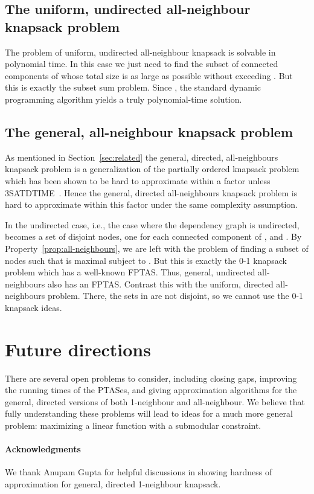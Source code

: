 \documentclass[12pt]{article}
\begin{document}
\subsection{The uniform, undirected all-neighbour knapsack problem}

The problem of uniform, undirected all-neighbour knapsack is
solvable in polynomial time.
In this case we just need to find the subset of connected components of 
whose total size is as large as possible without exceeding .
But this is exactly the subset sum problem.  Since , the standard
dynamic programming algorithm yields a truly polynomial-time 
solution.

\subsection{The general, all-neighbour knapsack problem}

As mentioned in Section~\ref{sec:related} the general, directed, all-neighbours
knapsack problem is a generalization of the partially ordered knapsack
problem~\cite{Kolliopoulos:2007p1242} which has been shown to be hard to
approximate within a  factor unless
3SATDTIME~\cite{Hajiaghayi:2006p1244}.
Hence the general, directed all-neighbours knapsack problem is hard
to approximate within this factor under the same complexity assumption.

In the undirected case, i.e., the case where the dependency graph 
is undirected,  becomes a set of disjoint nodes,
one for each connected component of ,
and .  By Property~\ref{prop:all-neighbours},
we are left with the problem of finding a subset of nodes  such that  is maximal subject to .
But this is exactly the 0-1 knapsack problem which has a well-known
FPTAS.  Thus, general, undirected all-neighbours also has an FPTAS.
Contrast this with the uniform, directed all-neighbours problem.
There, the sets in  are not disjoint, so we cannot use
the 0-1 knapsack ideas.


\section{Future directions}

There are several open problems to consider, including closing gaps,
improving the running times of the PTASes, and giving approximation
algorithms for the general, directed versions of both 1-neighbour and
all-neighbour. We believe that fully understanding these problems will
lead to ideas for a much more general problem: maximizing a linear
function with a submodular constraint.






\paragraph{{\bf Acknowledgments}}
We thank Anupam Gupta for helpful
discussions in showing hardness of approximation for general,
directed 1-neighbour knapsack.






\newpage
\end{document}

